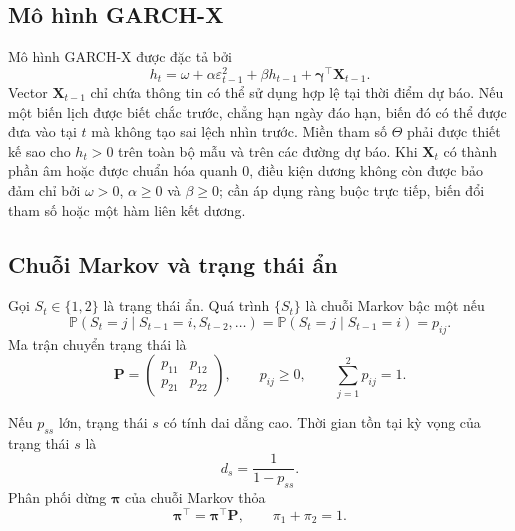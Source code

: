\documentclass[12pt,a4paper]{article}
\numberwithin{equation}{section}
\newcommand{\bm}[1]{\symbf{#1}}
\newcommand{\Xvec}{\bm{X}}
\newcommand{\Pmat}{\bm{P}}
\newcommand{\Prob}{\mathbb{P}}
\begin{document}
\subsection{Mô hình GARCH-X}\label{subsec:garchx-theory}

Mô hình GARCH-X được đặc tả bởi
\begin{equation}
  h_t
  =
  \omega
  +\alpha\varepsilon_{t-1}^{2}
  +\beta h_{t-1}
  +\bm{\gamma}^{\top}\Xvec_{t-1}.
  \label{eq:garchx}
\end{equation}
Vector $\Xvec_{t-1}$ chỉ chứa thông tin có thể sử dụng hợp lệ tại thời điểm dự báo. Nếu một biến lịch được biết chắc trước, chẳng hạn ngày đáo hạn, biến đó có thể được đưa vào tại $t$ mà không tạo sai lệch nhìn trước. Miền tham số $\Theta$ phải được thiết kế sao cho $h_t>0$ trên toàn bộ mẫu và trên các đường dự báo. Khi $\Xvec_t$ có thành phần âm hoặc được chuẩn hóa quanh $0$, điều kiện dương không còn được bảo đảm chỉ bởi $\omega>0$, $\alpha\ge0$ và $\beta\ge0$; cần áp dụng ràng buộc trực tiếp, biến đổi tham số hoặc một hàm liên kết dương.

\subsection{Chuỗi Markov và trạng thái ẩn}\label{subsec:markov}

Gọi $S_t\in\{1,2\}$ là trạng thái ẩn. Quá trình $\{S_t\}$ là chuỗi Markov bậc một nếu
\begin{equation}
  \Prob(S_t=j\mid S_{t-1}=i,S_{t-2},\ldots)
  =
  \Prob(S_t=j\mid S_{t-1}=i)
  =p_{ij}.
  \label{eq:markov-property}
\end{equation}
Ma trận chuyển trạng thái là
\begin{equation}
  \Pmat=
  \begin{pmatrix}
    p_{11} & p_{12}\\
    p_{21} & p_{22}
  \end{pmatrix},
  \qquad
  p_{ij}\ge0,
  \qquad
  \sum_{j=1}^{2}p_{ij}=1.
  \label{eq:transition-matrix}
\end{equation}

Nếu $p_{ss}$ lớn, trạng thái $s$ có tính dai dẳng cao. Thời gian tồn tại kỳ vọng của trạng thái $s$ là
\begin{equation}
  d_s=\frac{1}{1-p_{ss}}.
  \label{eq:expected-duration}
\end{equation}
Phân phối dừng $\bm\pi$ của chuỗi Markov thỏa
\begin{equation}
  \bm\pi^{\top}=\bm\pi^{\top}\Pmat,
  \qquad
  \pi_1+\pi_2=1.
  \label{eq:stationary-markov}
\end{equation}
\end{document}
